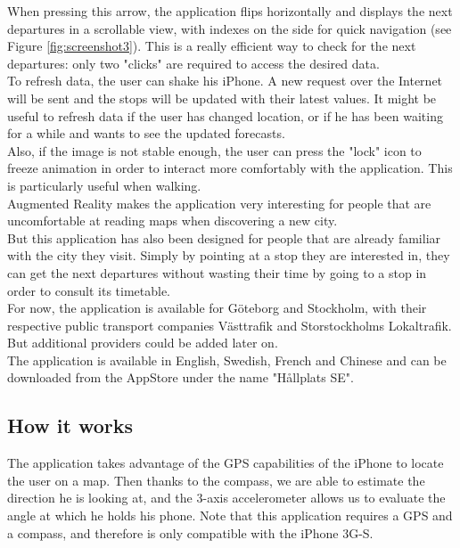 When pressing this arrow, the application flips horizontally and displays the next departures in a scrollable view, with indexes on the side for quick navigation (see Figure \ref{fig:screenshot3}). This is a really efficient way to check for the next departures: only two "clicks" are required to access the desired data.\\

To refresh data, the user can shake his iPhone. A new request over the Internet will be sent and the stops will be updated with their latest values. It might be useful to refresh data if the user has changed location, or if he has been waiting for a while and wants to see the updated forecasts.\\

Also, if the image is not stable enough, the user can press the "lock" icon to freeze animation in order to interact more comfortably with the application. This is particularly useful when walking.\\

Augmented Reality makes the application very interesting for people that are uncomfortable at reading maps when discovering a new city.\\

But this application has also been designed for people that are already familiar with the city they visit. Simply by pointing at a stop they are interested in, they can get the next departures without wasting their time by going to a stop in order to consult its timetable.\\

For now, the application is available for Göteborg and Stockholm, with their respective public transport companies Västtrafik and Storstockholms Lokaltrafik. But additional providers could be added later on.\\

The application is available in English, Swedish, French and Chinese and can be downloaded from the AppStore under the name "Hållplats SE".

\subsection{How it works}

The application takes advantage of the GPS capabilities of the iPhone to locate the user on a map. Then thanks to the compass, we are able to estimate the direction he is looking at, and the 3-axis accelerometer allows us to evaluate the angle at which he holds his phone. Note that this application requires a GPS and a compass, and therefore is only compatible with the iPhone 3G-S.\\


